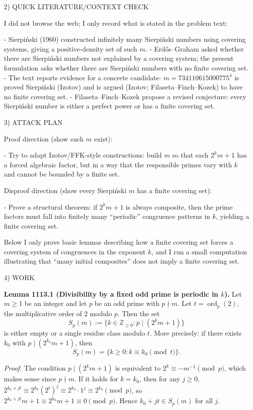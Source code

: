 2) QUICK LITERATURE/CONTEXT CHECK

I did not browse the web; I only record what is stated in the problem text:

- Sierpi\'nski (1960) constructed infinitely many Sierpi\'nski numbers using covering systems, giving a positive-density set of such \(m\).
- Erd\H{o}s--Graham asked whether there are Sierpi\'nski numbers not explained by a covering system; the present formulation asks whether there are Sierpi\'nski numbers with no finite covering set.
- The text reports evidence for a concrete candidate: \(m=734110615000775^4\) is proved Sierpi\'nski (Izotov) and is argued (Izotov; Filaseta--Finch--Kozek) to have no finite covering set.
- Filaseta--Finch--Kozek propose a revised conjecture: every Sierpi\'nski number is either a perfect power or has a finite covering set.

3) ATTACK PLAN

Proof direction (show such \(m\) exist):

- Try to adapt Izotov/FFK-style constructions: build \(m\) so that each \(2^k m+1\) has a forced algebraic factor, but in a way that the responsible primes vary with \(k\) and cannot be bounded by a finite set.

Disproof direction (show every Sierpi\'nski \(m\) has a finite covering set):

- Prove a structural theorem: if \(2^k m+1\) is always composite, then the prime factors must fall into finitely many ``periodic'' congruence patterns in \(k\), yielding a finite covering set.

Below I only prove basic lemmas describing how a finite covering set forces a covering system of congruences in the exponent \(k\), and I run a small computation illustrating that ``many initial composites'' does not imply a finite covering set.

4) WORK

\textbf{Lemma 1113.1 (Divisibility by a fixed odd prime is periodic in \(k\)).}
Let \(m\ge 1\) be an integer and let \(p\) be an odd prime with \(p\nmid m\). Let \(t=\operatorname{ord}_p(2)\), the multiplicative order of \(2\) modulo \(p\). Then the set
\[
S_p(m):=\{k\in\mathbb{Z}_{\ge 0}: p\mid (2^k m+1)\}
\]
is either empty or a single residue class modulo \(t\). More precisely: if there exists \(k_0\) with \(p\mid (2^{k_0}m+1)\), then
\[
S_p(m)=\{k\ge 0: k\equiv k_0\pmod t\}.
\]

\emph{Proof.}
The condition \(p\mid (2^k m+1)\) is equivalent to
\(2^k\equiv -m^{-1}\pmod p\), which makes sense since \(p\nmid m\).
If it holds for \(k=k_0\), then for any \(j\ge 0\),
\(2^{k_0+jt}\equiv 2^{k_0}(2^t)^j\equiv 2^{k_0}\cdot 1^j\equiv 2^{k_0}\pmod p\), so \(2^{k_0+jt}m+1\equiv 2^{k_0}m+1\equiv 0\pmod p\). Hence \(k_0+jt\in S_p(m)\) for all \(j\).

